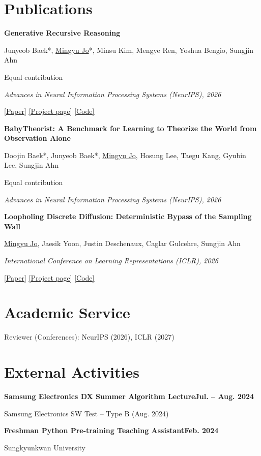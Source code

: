 \documentclass[10pt,a4paper]{article}
\begin{document}
\section*{Publications}
\textbf{Generative Recursive Reasoning}\par
Junyeob Baek*, \underline{Mingyu Jo}*, Minsu Kim, Mengye Ren, Yoshua Bengio, Sungjin Ahn\par
{\small * Equal contribution}\par
\textit{Advances in Neural Information Processing Systems (NeurIPS), 2026}\par
\href{https://arxiv.org/abs/2605.19376}{[Paper]}\enspace
\href{https://ahn-ml.github.io/gram-website/}{[Project page]}\enspace
\href{https://github.com/ahn-ml/gram-release}{[Code]}

\medskip
\textbf{BabyTheorist: A Benchmark for Learning to Theorize the World from Observation Alone}\par
Doojin Baek*, Junyeob Baek*, \underline{Mingyu Jo}, Hosung Lee, Taegu Kang, Gyubin Lee, Sungjin Ahn\par
{\small * Equal contribution}\par
\textit{Advances in Neural Information Processing Systems (NeurIPS), 2026}

\medskip
\textbf{Loopholing Discrete Diffusion: Deterministic Bypass of the Sampling Wall}\par
\underline{Mingyu Jo}, Jaesik Yoon, Justin Deschenaux, Caglar Gulcehre, Sungjin Ahn\par
\textit{International Conference on Learning Representations (ICLR), 2026}\par
\href{https://arxiv.org/abs/2510.19304}{[Paper]}\enspace
\href{https://sites.google.com/view/lddms/home}{[Project page]}\enspace
\href{https://github.com/ahn-ml/lddm}{[Code]}

\section*{Academic Service}
Reviewer (Conferences): NeurIPS (2026), ICLR (2027)

\section*{External Activities}
\textbf{Samsung Electronics DX Summer Algorithm Lecture}\hfill \textbf{Jul. -- Aug. 2024}\par
Samsung Electronics SW Test -- Type B (Aug. 2024)

\medskip
\textbf{Freshman Python Pre-training Teaching Assistant}\hfill \textbf{Feb. 2024}\par
Sungkyunkwan University
\end{document}
